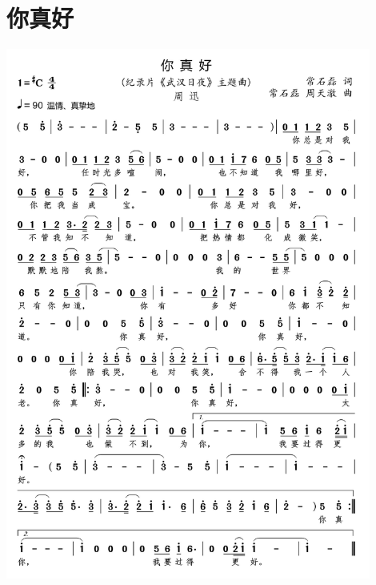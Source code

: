 \documentclass[cn,pad,twocol]{elegantbook}
\begin{document}
\section{你真好} \includegraphics[width=0.9\textwidth]{rpi400/20210206你真好.png}
\end{document}
